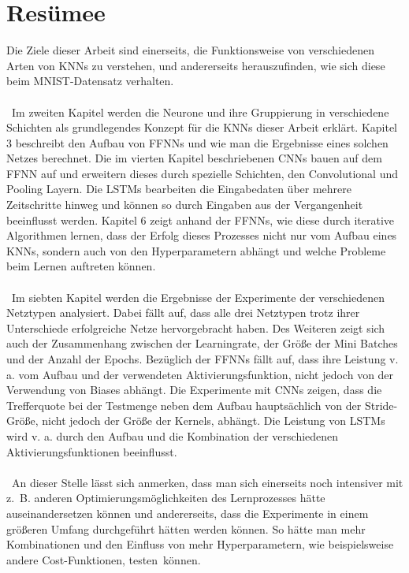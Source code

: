 \documentclass[a4paper,12pt,ngerman,oneside]{scrreprt}	%
\begin{document}
			
	
	\chapter{Resümee}
	Die Ziele dieser Arbeit sind einerseits, die Funktionsweise von verschiedenen Arten von KNNs zu verstehen, und andererseits herauszufinden, wie sich diese beim MNIST-Datensatz verhalten. 
	\\ \
	\\ \
	Im zweiten Kapitel werden die Neurone und ihre Gruppierung in verschiedene Schichten als grundlegendes Konzept für die KNNs dieser Arbeit erklärt. Kapitel 3 beschreibt den Aufbau von FFNNs und wie man die Ergebnisse eines solchen Netzes berechnet. Die im vierten Kapitel beschriebenen CNNs bauen auf dem FFNN auf und erweitern dieses durch spezielle Schichten, den Convolutional und Pooling Layern. Die LSTMs bearbeiten die Eingabedaten über mehrere Zeitschritte hinweg und können so durch Eingaben aus der Vergangenheit beeinflusst werden. Kapitel 6 zeigt anhand der FFNNs, wie diese durch iterative Algorithmen lernen, dass der Erfolg dieses Prozesses nicht nur vom Aufbau eines KNNs, sondern auch von den Hyperparametern abhängt und welche Probleme beim Lernen auftreten können. 
	\\ \
	\\ \
	Im siebten Kapitel werden die Ergebnisse der Experimente der verschiedenen Netztypen analysiert. Dabei fällt auf, dass alle drei Netztypen trotz ihrer Unterschiede erfolgreiche Netze hervorgebracht haben. Des Weiteren zeigt sich auch der Zusammenhang zwischen der Learningrate, der Größe der Mini Batches und der Anzahl der Epochs. Bezüglich der FFNNs fällt auf, dass ihre Leistung v. a. vom Aufbau und der verwendeten Aktivierungsfunktion, nicht jedoch von der Verwendung von Biases abhängt. Die Experimente mit CNNs zeigen, dass die Trefferquote bei der Testmenge neben dem Aufbau hauptsächlich von der Stride-Größe, nicht jedoch der Größe der Kernels, abhängt. Die Leistung von LSTMs wird v. a. durch den Aufbau und die Kombination der verschiedenen Aktivierungsfunktionen beeinflusst. 
	\\ \
	\\ \
	An dieser Stelle lässt sich anmerken, dass man sich einerseits noch intensiver mit \mbox{z. B.} anderen Optimierungsmöglichkeiten des Lernprozesses hätte auseinandersetzen können und andererseits, dass die Experimente in einem größeren Umfang durchgeführt hätten werden können. So hätte man mehr Kombinationen und den Einfluss von mehr Hyperparametern, wie beispielsweise andere Cost-Funktionen, \mbox{testen können.}
	
\end{document}
